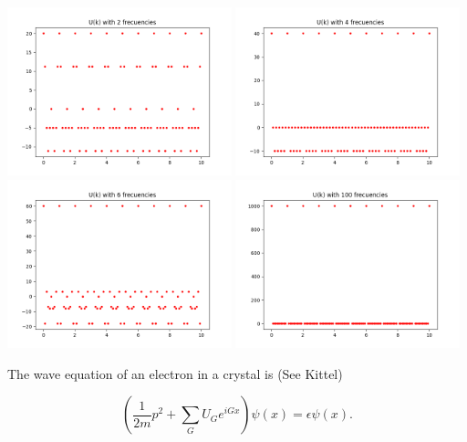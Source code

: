 \begin{questions}
\begin{solution}
\begin{center}
  \includegraphics[width=65mm]{uk2}
  \includegraphics[width=65mm]{uk4}
  \includegraphics[width=65mm]{uk6}
  \includegraphics[width=65mm]{uk100}
\end{center}

\label{fig:four}\vspace{0.5cm}

The wave equation of an electron in a crystal is (See Kittel)

\begin{equation}
  \left(\frac{1}{2m}p^2 + \sum_G U_Ge^{iGx}\right) \psi(x) = \epsilon \psi(x).
  \label{sch}
\end{equation}


\end{solution}
\end{questions}
